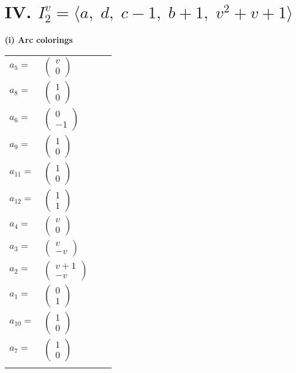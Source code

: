 \documentclass[1p]{elsarticle_modified}
\theoremstyle{definition}
\begin{document}
\centering \section*{IV. $I^v_{2}= \langle a,\;d,\;c-1,\;b+1,\;v^2+v+1 \rangle$}
\flushleft \textbf{(i) Arc colorings}\\
\begin{tabular}{m{7pt} m{180pt} m{7pt} m{180pt} }
\flushright $a_{5}=$&$\begin{pmatrix}v\\0\end{pmatrix}$ \\
\flushright $a_{8}=$&$\begin{pmatrix}1\\0\end{pmatrix}$ \\
\flushright $a_{6}=$&$\begin{pmatrix}0\\-1\end{pmatrix}$ \\
\flushright $a_{9}=$&$\begin{pmatrix}1\\0\end{pmatrix}$ \\
\flushright $a_{11}=$&$\begin{pmatrix}1\\0\end{pmatrix}$ \\
\flushright $a_{12}=$&$\begin{pmatrix}1\\1\end{pmatrix}$ \\
\flushright $a_{4}=$&$\begin{pmatrix}v\\0\end{pmatrix}$ \\
\flushright $a_{3}=$&$\begin{pmatrix}v\\- v\end{pmatrix}$ \\
\flushright $a_{2}=$&$\begin{pmatrix}v+1\\- v\end{pmatrix}$ \\
\flushright $a_{1}=$&$\begin{pmatrix}0\\1\end{pmatrix}$ \\
\flushright $a_{10}=$&$\begin{pmatrix}1\\0\end{pmatrix}$ \\
\flushright $a_{7}=$&$\begin{pmatrix}1\\0\end{pmatrix}$\\&\end{tabular}
\end{document}
